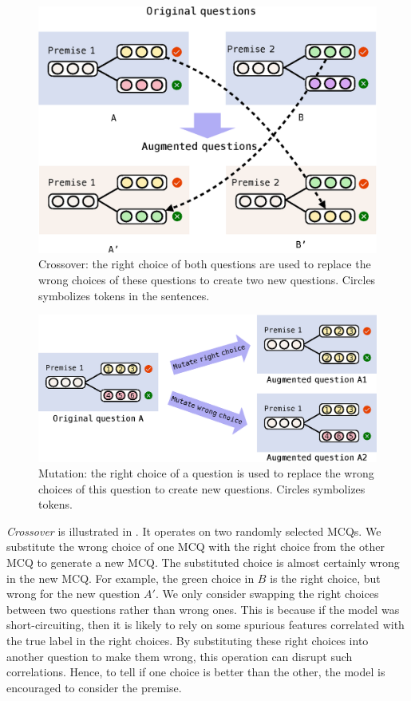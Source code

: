 \begin{figure}[htbp]
        \centering
        \includegraphics[width=0.8\columnwidth]{figure/cross.eps}
        \caption{Crossover: the right choice of both questions
                are used to replace the wrong choices of these questions to create
                two new questions. Circles symbolizes tokens in the sentences.}
        \label{fig:cross}
\end{figure}
\begin{figure}[th]
        \centering
        \includegraphics[width=\columnwidth]{figure/revised_mutation.eps}
        \caption{Mutation: the right choice of a question
                is used to replace the wrong choices of this question to create
                new questions. Circles symbolizes tokens.}
        \label{fig:mutation}
\end{figure}
\textit{Crossover} is illustrated in . It operates 
on two randomly selected MCQs.
We substitute the wrong choice of one MCQ with the right choice from 
the other MCQ to generate a new MCQ. The substituted choice is 
almost certainly wrong in the new MCQ. 
For example, the green choice in $B$ is the right choice, 
but wrong for the new question ${A}'$. 
We only consider swapping the right choices between 
two questions rather than wrong ones. 
This is because if the model was short-circuiting,
then it is likely to rely on some spurious features correlated with the true
label in the right choices. 
By substituting these right choices into another question to make them wrong, 
this operation can disrupt such correlations.
Hence, to tell if one choice is better than the other, 
the model is encouraged to consider the premise. 




